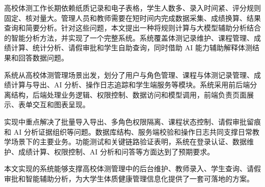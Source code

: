 
\begin{chineseabstract}

高校体测工作长期依赖纸质记录和电子表格，学生人数多、录入时间紧、评分规则固定、核对量大。管理人员和教师需要在短时间内完成数据采集、成绩换算、结果查询和简要分析。针对这些问题，本文提出一种将规则计算与大模型辅助分析结合的智能分析方法，并实现了一个完整系统。系统覆盖体测记录维护、课程管理、成绩计算、统计分析、请假审批和学生自助查询，同时借助 AI 能力辅助解释体测结果和回答数据问题。

系统从高校体测管理场景出发，划分了用户与角色管理、课程与体测记录管理、成绩计算与导出、AI 分析、操作日志追踪和学生端服务等模块。系统采用前后端分离结构，后端处理业务逻辑、权限控制、数据访问和模型调用，前端负责页面展示、表单交互和图表呈现。

实现中重点解决了批量导入导出、多角色权限隔离、课程状态控制、请假审批留痕和 AI 分析证据组织等问题。数据库结构、服务端校验和操作日志共同支撑日常教学场景下的主要业务。功能测试和关键链路验证表明，系统在登录认证、数据维护、成绩计算、权限控制、AI 分析和问答等方面达到了预期要求。

本文实现的系统能够支撑高校体测管理中的后台维护、教师录入、学生查询、请假审批和智能辅助分析，为大学生体质健康管理信息化提供了一套可落地的方案。

\end{chineseabstract}

